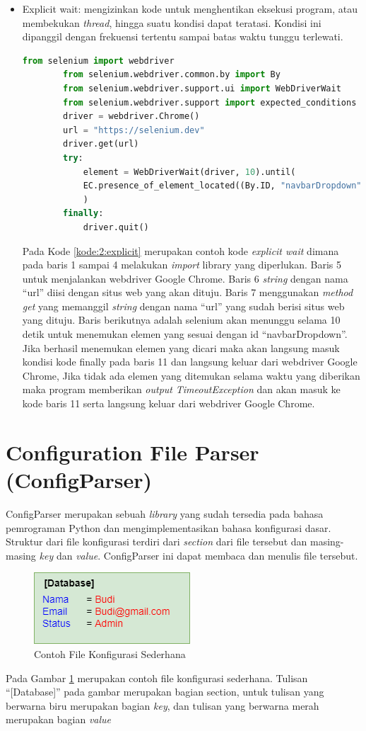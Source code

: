 \begin{itemize}
	\item Explicit wait: mengizinkan kode untuk menghentikan eksekusi program, atau membekukan \textit{thread}, hingga suatu kondisi dapat teratasi. Kondisi ini dipanggil dengan frekuensi tertentu sampai batas waktu tunggu terlewati.
	\begin{lstlisting}[language=python, caption=Contoh kode Explicit wait, label=kode:2:explicit]
		from selenium import webdriver
		from selenium.webdriver.common.by import By
		from selenium.webdriver.support.ui import WebDriverWait
		from selenium.webdriver.support import expected_conditions as EC
		driver = webdriver.Chrome()
		url = "https://selenium.dev"
		driver.get(url)	
		try:
			element = WebDriverWait(driver, 10).until(
			EC.presence_of_element_located((By.ID, "navbarDropdown"))
			)
		finally:
			driver.quit()
	\end{lstlisting}
	Pada Kode \ref{kode:2:explicit} merupakan contoh kode \textit{explicit wait} dimana pada baris 1 sampai 4 melakukan \textit{import} library yang diperlukan. Baris 5 untuk menjalankan webdriver Google Chrome. Baris 6 \textit{string} dengan nama ``url'' diisi dengan situs web yang akan dituju. Baris 7 menggunakan \textit{method get} yang memanggil \textit{string} dengan nama ``url'' yang sudah berisi situs web yang dituju. Baris berikutnya adalah selenium akan menunggu selama 10 detik untuk menemukan elemen yang sesuai dengan id ``navbarDropdown''. Jika berhasil menemukan elemen yang dicari maka akan langsung masuk kondisi kode finally pada baris 11 dan langsung keluar dari webdriver Google Chrome, Jika tidak ada elemen yang ditemukan selama waktu yang diberikan maka program memberikan \textit{output} \textit{TimeoutException} dan akan masuk ke kode baris 11 serta langsung keluar dari webdriver Google Chrome.	
\end{itemize}

\section{Configuration File Parser (ConfigParser)}
\label{sec:config}
ConfigParser merupakan sebuah \textit{library} yang sudah tersedia pada bahasa pemrograman Python dan mengimplementasikan bahasa konfigurasi dasar\cite{parser}. Struktur dari file konfigurasi terdiri dari \textit{section} dari file tersebut dan masing-masing \textit{key} dan \textit{value}. ConfigParser ini dapat membaca dan menulis file tersebut. 
\begin{figure}[H]
	\centering
	\includegraphics[scale=0.7]{Gambar/config.png}
	\caption{Contoh File Konfigurasi Sederhana} 
	\label{fig:config}
\end{figure}
Pada Gambar \ref{fig:config} merupakan contoh file konfigurasi sederhana. Tulisan ``[Database]'' pada gambar merupakan bagian section, untuk tulisan yang berwarna biru merupakan bagian \textit{key}, dan tulisan yang berwarna merah merupakan bagian \textit{value}